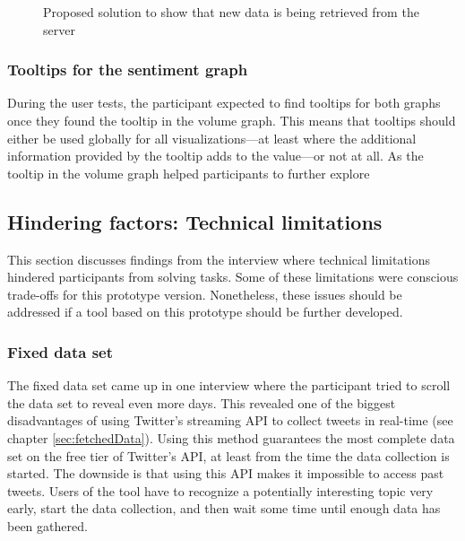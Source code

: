 \begin{figure}[htbp]
    \caption{Proposed solution to show that new data is being retrieved from the server}
    \label{fig:fetching_state}
\end{figure}

\subsubsection*{Tooltips for the sentiment graph}
During the user tests, the participant expected to find tooltips for both graphs once they found the tooltip in the volume graph. This means that tooltips should either be used globally for all visualizations---at least where the additional information provided by the tooltip adds to the value---or not at all. As the tooltip in the volume graph helped participants to further explore 

\subsection{Hindering factors: Technical limitations}
This section discusses findings from the interview where technical limitations hindered participants from solving tasks. Some of these limitations were conscious trade-offs for this prototype version. Nonetheless, these issues should be addressed if a tool based on this prototype should be further developed.

\subsubsection*{Fixed data set}
The fixed data set came up in one interview where the participant tried to scroll the data set to reveal even more days. This revealed one of the biggest disadvantages of using Twitter's streaming API to collect tweets in real-time (see chapter \ref{sec:fetchedData}). Using this method guarantees the most complete data set on the free tier of Twitter's API, at least from the time the data collection is started. The downside is that using this API makes it impossible to access past tweets. Users of the tool have to recognize a potentially interesting topic very early, start the data collection, and then wait some time until enough data has been gathered.

